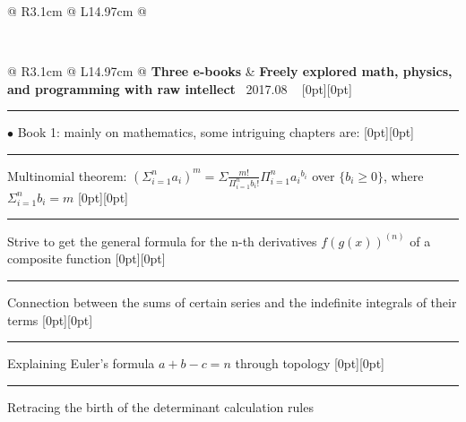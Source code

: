 {{\begin{tabularx}{\linewidth}{@{} R{3.1cm} @{\phantom{d}} L{14.97cm} @{}}
\end{tabularx}
\\
\begin{tabularx}{\linewidth}{@{} R{3.1cm} @{\phantom{d}} L{14.97cm} @{}}
	\textbf{Three e-books} & \hspace{10pt} \textbf{Freely explored math, physics, and programming with raw intellect} \hfill \textendash\ 2017.08 \newline \vspace{2pt} \ \hspace{-3pt} \raisebox{0.09\height}[0pt][0pt]{\vrule width0.5pt height30.0pt} \hspace{-0.26em}\rule[0.25em]{1.0em}{0.5pt}\!\! $\bullet$ {\small Book 1: mainly on mathematics, some intriguing chapters are:} \newline \vspace{-3pt} \hspace{12.5pt} \raisebox{0.18\height}[0pt][0pt]{\vrule width0.5pt height15.0pt} \hspace{-0.26em}\rule[0.25em]{1.0em}{0.5pt}\!\! \raisebox{0.2\height}{\scriptsize $\blacktriangleright$} {\small Multinomial theorem: $(\Sigma_{i=1}^n a_i)^m = \Sigma \frac{m!}{\Pi_{i=1}^n b_i!} \Pi_{i=1}^n {a_i}^{b_i}$ over $\{b_i \geq 0\}$, where $\Sigma_{i=1}^n b_i = m$} \newline \vspace{-3pt} \hspace{12.5pt} \raisebox{0.18\height}[0pt][0pt]{\vrule width0.5pt height15.0pt} \hspace{-0.26em}\rule[0.25em]{1.0em}{0.5pt}\!\! \raisebox{0.2\height}{\scriptsize $\blacktriangleright$} {\small Strive to get the general formula for the n-th derivatives $f(g(x))^{(n)}$ of a composite function} \newline \vspace{-3pt} \hspace{12.5pt} \raisebox{0.18\height}[0pt][0pt]{\vrule width0.5pt height15.0pt} \hspace{-0.26em}\rule[0.25em]{1.0em}{0.5pt}\!\! \raisebox{0.2\height}{\scriptsize $\blacktriangleright$} {\small Connection between the sums of certain series and the indefinite integrals of their terms} \newline \vspace{-3pt} \hspace{12.5pt} \raisebox{0.18\height}[0pt][0pt]{\vrule width0.5pt height15.0pt} \hspace{-0.26em}\rule[0.25em]{1.0em}{0.5pt}\!\! \raisebox{0.2\height}{\scriptsize $\blacktriangleright$} {\small Explaining Euler's formula $a+b-c=n$ through topology} \newline \vspace{-3pt} \hspace{12.5pt} \raisebox{0.09\height}[0pt][0pt]{\vrule width0.5pt height30.0pt} \hspace{-0.26em}\rule[0.25em]{1.0em}{0.5pt}\!\! \raisebox{0.2\height}{\scriptsize $\blacktriangleright$} {\small Retracing the birth of the determinant calculation rules} \newline 
\end{tabularx}}}
